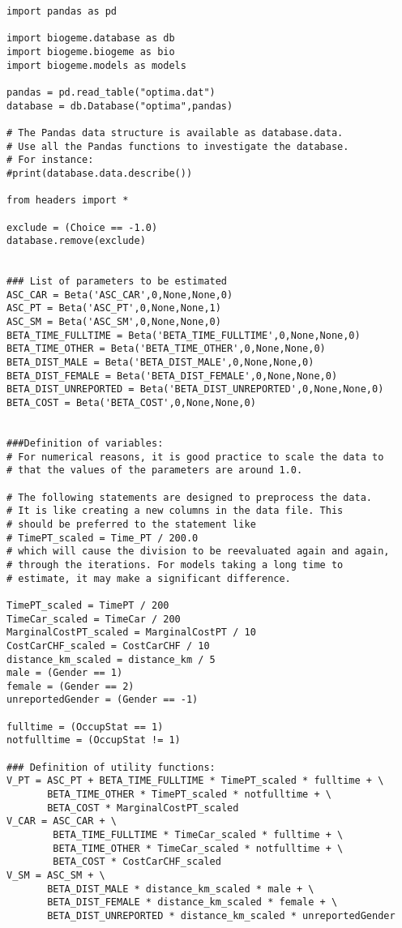 \documentclass[12pt,a4paper]{article}
\begin{document}
\begin{lstlisting}[style=numbers]
import pandas as pd

import biogeme.database as db
import biogeme.biogeme as bio
import biogeme.models as models

pandas = pd.read_table("optima.dat")
database = db.Database("optima",pandas)

# The Pandas data structure is available as database.data.
# Use all the Pandas functions to investigate the database.
# For instance:
#print(database.data.describe())

from headers import *

exclude = (Choice == -1.0)
database.remove(exclude)


### List of parameters to be estimated
ASC_CAR = Beta('ASC_CAR',0,None,None,0)
ASC_PT = Beta('ASC_PT',0,None,None,1)
ASC_SM = Beta('ASC_SM',0,None,None,0)
BETA_TIME_FULLTIME = Beta('BETA_TIME_FULLTIME',0,None,None,0)
BETA_TIME_OTHER = Beta('BETA_TIME_OTHER',0,None,None,0)
BETA_DIST_MALE = Beta('BETA_DIST_MALE',0,None,None,0)
BETA_DIST_FEMALE = Beta('BETA_DIST_FEMALE',0,None,None,0)
BETA_DIST_UNREPORTED = Beta('BETA_DIST_UNREPORTED',0,None,None,0)
BETA_COST = Beta('BETA_COST',0,None,None,0)


###Definition of variables:
# For numerical reasons, it is good practice to scale the data to
# that the values of the parameters are around 1.0.

# The following statements are designed to preprocess the data.
# It is like creating a new columns in the data file. This
# should be preferred to the statement like
# TimePT_scaled = Time_PT / 200.0
# which will cause the division to be reevaluated again and again,
# through the iterations. For models taking a long time to
# estimate, it may make a significant difference.

TimePT_scaled = TimePT / 200
TimeCar_scaled = TimeCar / 200
MarginalCostPT_scaled = MarginalCostPT / 10 
CostCarCHF_scaled = CostCarCHF / 10
distance_km_scaled = distance_km / 5
male = (Gender == 1)
female = (Gender == 2)
unreportedGender = (Gender == -1)

fulltime = (OccupStat == 1)
notfulltime = (OccupStat != 1)

### Definition of utility functions:
V_PT = ASC_PT + BETA_TIME_FULLTIME * TimePT_scaled * fulltime + \
       BETA_TIME_OTHER * TimePT_scaled * notfulltime + \
       BETA_COST * MarginalCostPT_scaled
V_CAR = ASC_CAR + \
        BETA_TIME_FULLTIME * TimeCar_scaled * fulltime + \
        BETA_TIME_OTHER * TimeCar_scaled * notfulltime + \
        BETA_COST * CostCarCHF_scaled
V_SM = ASC_SM + \
       BETA_DIST_MALE * distance_km_scaled * male + \
       BETA_DIST_FEMALE * distance_km_scaled * female + \
       BETA_DIST_UNREPORTED * distance_km_scaled * unreportedGender


\end{lstlisting}
\end{document}
